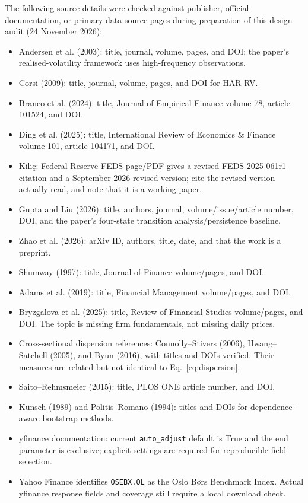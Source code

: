 \documentclass[11pt,a4paper]{article}
\begin{document}
The following source details were checked against publisher, official documentation, or primary data-source pages during preparation of this design audit (24 November 2026):
\begin{itemize}
  \item Andersen et al. (2003): title, journal, volume, pages, and DOI; the paper's realised-volatility framework uses high-frequency observations.
  \item Corsi (2009): title, journal, volume, pages, and DOI for HAR-RV.
  \item Branco et al. (2024): title, Journal of Empirical Finance volume 78, article 101524, and DOI.
  \item Ding et al. (2025): title, International Review of Economics \& Finance volume 101, article 104171, and DOI.
  \item Kili\c{c}: Federal Reserve FEDS page/PDF gives a revised FEDS 2025-061r1 citation and a September 2026 revised version; cite the revised version actually read, and note that it is a working paper.
  \item Gupta and Liu (2026): title, authors, journal, volume/issue/article number, DOI, and the paper's four-state transition analysis/persistence baseline.
  \item Zhao et al. (2026): arXiv ID, authors, title, date, and that the work is a preprint.
  \item Shumway (1997): title, Journal of Finance volume/pages, and DOI.
  \item Adams et al. (2019): title, Financial Management volume/pages, and DOI.
  \item Bryzgalova et al. (2025): title, Review of Financial Studies volume/pages, and DOI. The topic is missing firm fundamentals, not missing daily prices.
  \item Cross-sectional dispersion references: Connolly--Stivers (2006), Hwang--Satchell (2005), and Byun (2016), with titles and DOIs verified. Their measures are related but not identical to Eq.~\eqref{eq:dispersion}.
  \item Saito--Rehmsmeier (2015): title, PLOS ONE article number, and DOI.
  \item K\"unsch (1989) and Politis--Romano (1994): titles and DOIs for dependence-aware bootstrap methods.
  \item yfinance documentation: current \texttt{auto\_adjust} default is True and the end parameter is exclusive; explicit settings are required for reproducible field selection.
  \item Yahoo Finance identifies \texttt{OSEBX.OL} as the Oslo B\o rs Benchmark Index. Actual yfinance response fields and coverage still require a local download check.

\end{itemize}
\end{document}
